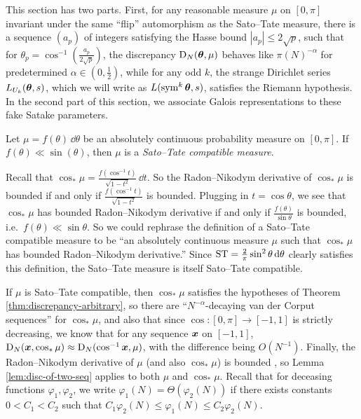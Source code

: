 This section has two parts. First, for any reasonable measure $\mu$ on 
$[0,\pi]$ invariant under the same ``flip'' automorphism as the Sato--Tate 
measure, there is a sequence $(a_p)$ of integers satisfying the Hasse 
bound $|a_p|\leqslant 2\sqrt p$, such that for 
$\theta_p = \cos^{-1}\left(\frac{a_p}{2\sqrt p}\right)$, the discrepancy 
$\operatorname{D}_N({\boldsymbol\theta},\mu)$ behaves like $\pi(N)^{-\alpha}$ for predetermined 
$\alpha\in \left(0,\frac 1 2\right)$, while for any odd $k$, the strange 
Dirichlet series $L_{U_k}({\boldsymbol\theta},s)$, which we will write as 
$L(\operatorname{sym}^k {\boldsymbol\theta},s)$, satisfies the Riemann hypothesis. In the second part of 
this section, we associate Galois representations to these fake Satake 
parameters. 

\begin{definition}
Let $\mu = f(\theta)\, \dd \theta$ be an absolutely continuous probability 
measure on $[0,\pi]$. If $f(\theta) \ll \sin(\theta)$, then $\mu$ is a 
\emph{Sato--Tate compatible measure}. 
\end{definition}

Recall that $\cos_\ast\mu = \frac{f(\cos^{-1} t)}{\sqrt{1-t^2}}\, \dd t$. So 
the Radon--Nikodym derivative of $\cos_\ast\mu$ is bounded if and only if 
$\frac{f(\cos^{-1} t)}{\sqrt{1-t^2}}$ is bounded. Plugging in 
$t = \cos\theta$, we see that $\cos_\ast\mu$ has bounded Radon--Nikodym 
derivative if and only if $\frac{f(\theta)}{\sin\theta}$ is bounded, 
i.e.~$f(\theta) \ll \sin\theta$. So we could rephrase the definition of a 
Sato--Tate compatible measure to be ``an absolutely continuous measure $\mu$ 
such that $\cos_\ast\mu$ has bounded Radon--Nikodym derivative.'' 
Since $\mathrm{ST} = \frac 2 \pi \sin^2\theta\, \mathrm{d}\theta$ clearly satisfies this 
definition, the Sato--Tate measure is itself Sato--Tate compatible. 

If $\mu$ is Sato--Tate compatible, then $\cos_\ast\mu$ 
satisfies the hypotheses of Theorem \ref{thm:discrepancy-arbitrary}, so 
there are ``$N^{-\alpha}$-decaying van der Corput sequences'' for 
$\cos_\ast\mu$, and also that since $\cos\colon [0,\pi] \to [-1,1]$ is 
strictly decreasing, we know that for any sequence ${\boldsymbol x}$ on $[-1,1]$, 
$\operatorname{D}_N({\boldsymbol x},\cos_\ast\mu) \approx \operatorname{D}_N(\cos^{-1}{\boldsymbol x},\mu)$, with the 
difference being $O(N^{-1})$.  Finally, the 
Radon--Nikodym derivative of $\mu$ (and also $\cos_\ast\mu$) is bounded , so 
Lemma \ref{lem:disc-of-two-seq} applies to both $\mu$ and $\cos_\ast\mu$. 
Recall that for deceasing functions 
$\varphi_1,\varphi_2$, we write $\varphi_1(N) = \Theta(\varphi_2(N))$ if 
there exists constants $0 < C_1 < C_2$ such that 
$C_1 \varphi_2(N) \leqslant \varphi_1(N) \leqslant C_2 \varphi_2(N)$. 


